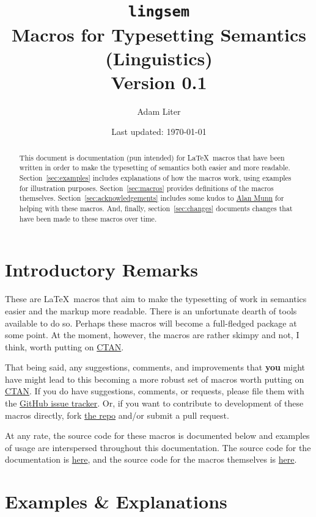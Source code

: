 \documentclass{article}
\title{\texttt{lingsem} \\ Macros for Typesetting Semantics (Linguistics) \\ Version 0.1}
\author{Adam Liter}
\date{Last updated: \today}
\begin{document}
\maketitle

\begin{abstract}
This document is documentation (pun intended) for \LaTeX\ macros that have been written in order to make the typesetting of semantics both easier and more readable. Section~\ref{sec:examples} includes explanations of how the macros work, using examples for illustration purposes. Section~\ref{sec:macros} provides definitions of the macros themselves. Section~\ref{sec:acknowledgements} includes some kudos to \href{http://tex.stackexchange.com/users/2693/alan-munn}{Alan Munn} for helping with these macros. And, finally, section~\ref{sec:changes} documents changes that have been made to these macros over time. 
\end{abstract}

\section{Introductory Remarks}

These are \LaTeX\ macros that aim to make the typesetting of work in semantics easier and the markup more readable. There is an unfortunate dearth of tools available to do so. Perhaps these macros will become a full-fledged package at some point. At the moment, however, the macros are rather skimpy and not, I think, worth putting on \href{http://ctan.org}{CTAN}.

That being said, any suggestions, comments, and improvements that \textbf{you} might have might lead to this becoming a more robust set of macros worth putting on \href{http://ctan.org}{CTAN}. If you do have suggestions, comments, or requests, please file them with the \href{https://github.com/adamliter/lingsem/issues}{GitHub issue tracker}. Or, if you want to contribute to development of these macros directly, fork \href{https://github.com/adamliter/lingsem}{the repo} and/or submit a pull request.

At any rate, the source code for these macros is documented below and examples of usage are interspersed throughout this documentation. The source code for the documentation is \href{}{here}, and the source code for the macros themselves is \href{}{here}.

\section{Examples \& Explanations}\label{sec:examples}
\end{document}
